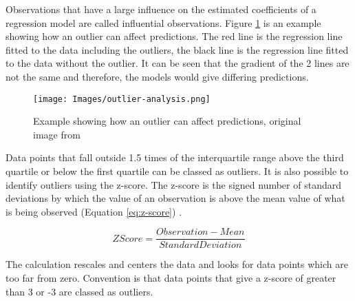 Observations that have a large influence on the estimated coefficients of a regression model are called influential observations. Figure \ref{fig:outlier} is an example showing how an outlier can affect predictions. The red line is the regression line fitted to the data including the outliers, the black line is the regression line fitted to the data without the outlier. It can be seen that the gradient of the 2 lines are not the same and therefore, the models would give differing predictions.  

\begin{figure}[H]
\begin{center}
    \texttt{[image: Images/outlier-analysis.png]}
    \caption{Example showing how an outlier can affect predictions, original image from \cite{forecasting-book}}
    \label{fig:outlier}
\end{center}
\end{figure}

Data points that fall outside 1.5 times of the interquartile range above the third quartile or below the first quartile can be classed as outliers. It is also possible to identify outliers using the z-score. The z-score is the signed number of standard deviations by which the value of an observation is above the mean value of what is being observed (Equation \ref{eq:z-score}) \cite{engineering-stats-handbook}. 

\begin{equation}
    \label{eq:z-score}
    Z Score = \frac{Observation - Mean}{Standard Deviation}
\end{equation}

The calculation rescales and centers the data and looks for data points which are too far from zero. Convention is that data points that give a z-score of greater than 3 or -3 are classed as outliers. 

\clearpage
